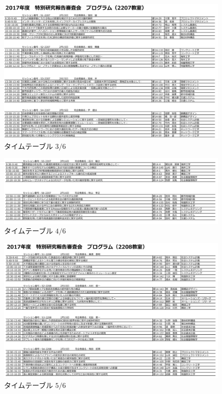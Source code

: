 \documentclass[a4paper,12pt,fleqn]{jarticle}
\begin{document}
\begin{figure}[H]
  \begin{center}
    \includegraphics[scale=0.65]{t3.png}
    \caption{タイムテーブル $3/6$}
  \end{center}
\end{figure}

\begin{figure}[H]
  \begin{center}
    \includegraphics[scale=0.65]{t4.png}
    \caption{タイムテーブル $4/6$}
  \end{center}
\end{figure}

\begin{figure}[H]
  \begin{center}
    \includegraphics[scale=0.65]{t5.png}
    \caption{タイムテーブル $5/6$}
  \end{center}
\end{figure}
\end{document}
